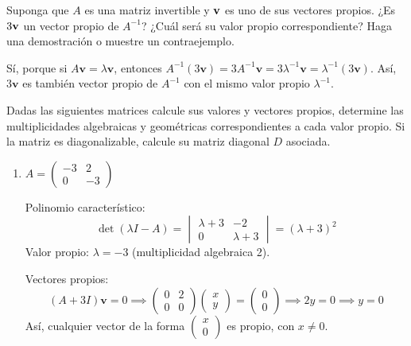 \begin{prob} Suponga que $A$ es una matriz invertible y ${\bf{v}}$ es uno de sus vectores propios.  ¿Es $3{\bf{v}}$ un vector propio de $A^{-1}$? ¿Cuál será su valor propio correspondiente? Haga una demostración o muestre un contraejemplo.
\begin{myproof}
Sí, porque si $A\mathbf{v} = \lambda \mathbf{v}$, entonces $A^{-1}(3\mathbf{v}) = 3A^{-1}\mathbf{v} = 3\lambda^{-1} \mathbf{v} = \lambda^{-1}(3\mathbf{v})$. Así, $3\mathbf{v}$ es también vector propio de $A^{-1}$ con el mismo valor propio $\lambda^{-1}$.
\end{myproof}
\end{prob}




\begin{prob}
Dadas las siguientes matrices calcule sus valores y vectores propios, determine las multiplicidades algebraicas y geométricas correspondientes a cada valor propio. Si la matriz es diagonalizable, calcule su matriz diagonal $D$ asociada.

\begin{enumerate}[$a)$]

\item $A=\left(\begin{matrix}
-3 & 2 \\ 0 & -3
\end{matrix}\right)$

\begin{myproof}
Polinomio característico:
\[
\det(\lambda I - A) = \begin{vmatrix} \lambda+3 & -2 \\ 0 & \lambda+3 \end{vmatrix} = (\lambda+3)^2
\]
Valor propio: $\lambda = -3$ (multiplicidad algebraica 2).

Vectores propios:
\[
(A + 3I)\mathbf{v} = 0 \implies \begin{pmatrix} 0 & 2 \\ 0 & 0 \end{pmatrix} \begin{pmatrix} x \\ y \end{pmatrix} = \begin{pmatrix} 0 \\ 0 \end{pmatrix} \implies 2y=0 \implies y=0
\]
Así, cualquier vector de la forma $\begin{pmatrix} x \\ 0 \end{pmatrix}$ es propio, con $x\neq 0$.


\end{myproof}
\end{enumerate}
\end{prob}
